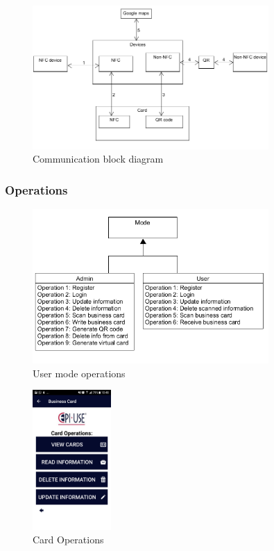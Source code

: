 \documentclass[english]{article}
\begin{document}
\begin{figure}[ht!]
\centering
\includegraphics[width=90mm]{communication.png}
\caption{Communication block diagram }
\end{figure}

				
\subsubsection{Operations}

\begin{figure}[ht!]
\centering
\includegraphics[width=90mm]{operation2.png}
\caption{User mode operations }
\end{figure}				

\begin{figure}[ht!]
\centering
\includegraphics[width=30mm]{operations.png}
\caption{Card Operations }
\end{figure}
\end{document}
